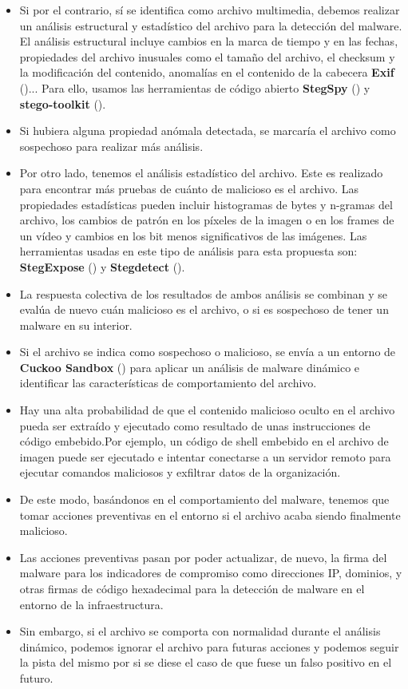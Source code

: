 \begin{itemize}
\item Si por el contrario, sí se identifica como archivo multimedia, debemos realizar un análisis estructural y estadístico del archivo para la detección del malware. El análisis estructural incluye cambios en la marca de tiempo y en las fechas, propiedades del archivo inusuales como el tamaño del archivo, el checksum y la modificación del contenido, anomalías en el contenido de la cabecera \textbf{Exif} (\cite{exif-header})... Para ello, usamos las herramientas de código abierto \textbf{StegSpy} (\cite{stegspy}) y \textbf{stego-toolkit} (\cite{stego-toolkit}). %
\item Si hubiera alguna propiedad anómala detectada, se marcaría el archivo como sospechoso para realizar más análisis.
\item Por otro lado, tenemos el análisis estadístico del archivo. Este es realizado para encontrar más pruebas de cuánto de malicioso es el archivo. Las propiedades estadísticas pueden incluir histogramas de bytes y n-gramas del archivo, los cambios de patrón en los píxeles de la imagen o en los frames de un vídeo y cambios en los bit menos significativos de las imágenes. Las herramientas usadas en este tipo de análisis para esta propuesta son: \textbf{StegExpose} (\cite{stegexpose}) y \textbf{Stegdetect} (\cite{stegdetect}). %
\item La respuesta colectiva de los resultados de ambos análisis se combinan y se evalúa de nuevo cuán malicioso es el archivo, o si es sospechoso de tener un malware en su interior.
\item Si el archivo se indica como sospechoso o malicioso, se envía a un entorno de \textbf{Cuckoo Sandbox} (\cite{cuckoo-sandbox}) para aplicar un análisis de malware dinámico e identificar las características de comportamiento del archivo.%
\item Hay una alta probabilidad de que el contenido malicioso oculto en el archivo pueda ser extraído y ejecutado como resultado de unas instrucciones de código embebido.Por ejemplo, un código de shell embebido en el archivo de imagen puede ser ejecutado e intentar conectarse a un servidor remoto para ejecutar comandos maliciosos y exfiltrar datos de la organización.
\item De este modo, basándonos en el comportamiento del malware, tenemos que tomar acciones preventivas en el entorno si el archivo acaba siendo finalmente malicioso.
\item Las acciones preventivas pasan por poder actualizar, de nuevo, la firma del malware para los indicadores de compromiso como direcciones IP, dominios, y otras firmas de código hexadecimal para la detección de malware en el entorno de la infraestructura.
\item Sin embargo, si el archivo se comporta con normalidad durante el análisis dinámico, podemos ignorar el archivo para futuras acciones y podemos seguir la pista del mismo por si se diese el caso de que fuese un falso positivo en el futuro.
\end{itemize}

